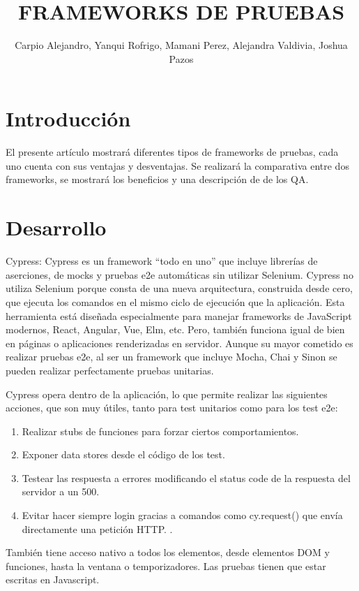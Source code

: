 \documentclass[letterpaper, 12pt, spanish]{article}
\author{Carpio Alejandro, Yanqui Rofrigo, Mamani Perez, Alejandra Valdivia, Joshua Pazos}
\title{ FRAMEWORKS DE PRUEBAS}
\begin{document}
\maketitle

\section{Introducción}
El presente artículo mostrará  diferentes tipos de frameworks de pruebas, cada uno cuenta con sus ventajas y desventajas. Se realizará la  comparativa entre dos frameworks, se mostrará  los beneficios y una descripción de de los QA.


\section{Desarrollo}

Cypress:
Cypress es un framework “todo en uno” que incluye librerías de aserciones, de mocks y pruebas e2e automáticas sin utilizar Selenium.
Cypress no utiliza Selenium porque consta de una nueva arquitectura, construida desde cero, que ejecuta los comandos en el mismo ciclo de ejecución que la aplicación.
Esta herramienta está diseñada especialmente para manejar frameworks de JavaScript modernos, React, Angular, Vue, Elm, etc. Pero, también funciona igual de bien en páginas o aplicaciones renderizadas en servidor.
Aunque su mayor cometido es realizar pruebas e2e, al ser un framework que incluye Mocha, Chai y Sinon se pueden realizar perfectamente pruebas unitarias.

Cypress opera dentro de la aplicación, lo que permite realizar las siguientes acciones, que son muy útiles, tanto para test unitarios como para los test e2e:
\begin{enumerate} %
	\item \textbf{} Realizar stubs de funciones para forzar ciertos comportamientos.
	\item \textbf{}Exponer data stores desde el código de los test.
	\item \textbf{}Testear las respuesta a errores modificando el status code de la respuesta del servidor a un 500.
	\item \textbf{}Evitar hacer siempre login gracias a comandos como cy.request() que envía directamente una petición HTTP. \cite{marr2015}.
\end{enumerate}

También tiene acceso nativo a todos los elementos, desde elementos DOM y funciones, hasta la ventana o temporizadores. Las pruebas tienen que estar escritas en Javascript.
\end{document}

